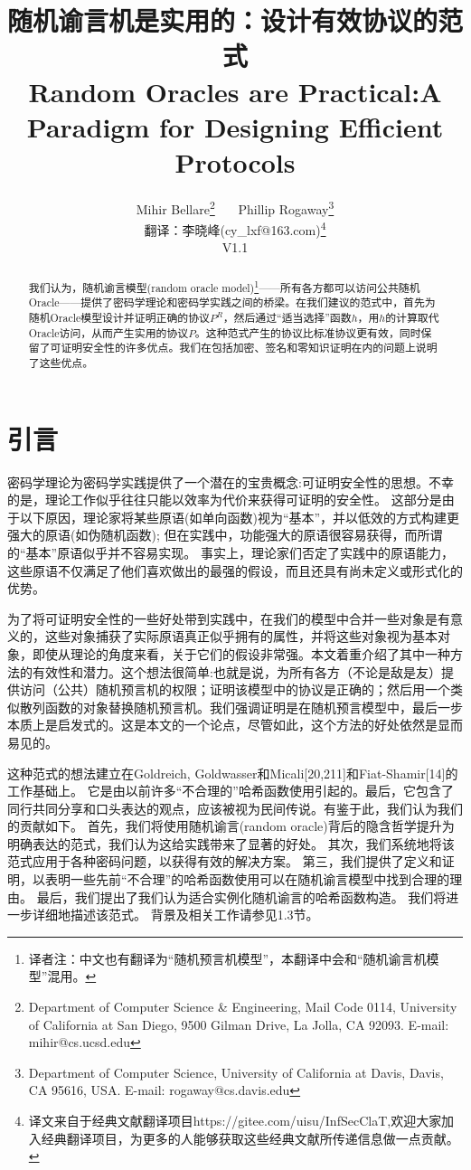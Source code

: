 \documentclass[]{article}
\title{随机谕言机是实用的：设计有效协议的范式\\
Random Oracles are Practical:A Paradigm for Designing Efficient Protocols}
\author{Mihir Bellare\footnote{ Department of Computer Science \& Engineering, Mail Code 0114, University of California at San Diego, 9500
		Gilman Drive, La Jolla, CA 92093. E-mail: mihir@cs.ucsd.edu} \ \ \  Phillip Rogaway\footnote{Department of Computer Science, University of California at Davis, Davis, CA 95616, USA. E-mail:
		rogaway@cs.davis.edu} \\
{\small  翻译：李晓峰(cy\_lxf@163.com)}\footnote{译文来自于经典文献翻译项目https://gitee.com/uisu/InfSecClaT,欢迎大家加入经典翻译项目，为更多的人能够获取这些经典文献所传递信息做一点贡献。}\\
{\small  V1.1}
}
\begin{document}
	
	\maketitle
	
	\begin{abstract}
		我们认为，随机谕言模型(random oracle model)\footnote{译者注：中文也有翻译为“随机预言机模型”，本翻译中会和“随机谕言机模型”混用。}——所有各方都可以访问公共随机Oracle——提供了密码学理论和密码学实践之间的桥梁。在我们建议的范式中，首先为随机Oracle模型设计并证明正确的协议$P^R$，然后通过“适当选择”函数$h$，用$h$的计算取代Oracle访问，从而产生实用的协议$P$。这种范式产生的协议比标准协议更有效，同时保留了可证明安全性的许多优点。我们在包括加密、签名和零知识证明在内的问题上说明了这些优点。
	\end{abstract}


    \section{引言}
	
	密码学理论为密码学实践提供了一个潜在的宝贵概念:可证明安全性的思想。不幸的是，理论工作似乎往往只能以效率为代价来获得可证明的安全性。
	这部分是由于以下原因，理论家将某些原语(如单向函数)视为“基本”，并以低效的方式构建更强大的原语(如伪随机函数);
	但在实践中，功能强大的原语很容易获得，而所谓的“基本”原语似乎并不容易实现。
	事实上，理论家们否定了实践中的原语能力，这些原语不仅满足了他们喜欢做出的最强的假设，而且还具有尚未定义或形式化的优势。
	
	
	为了将可证明安全性的一些好处带到实践中，在我们的模型中合并一些对象是有意义的，这些对象捕获了实际原语真正似乎拥有的属性，并将这些对象视为基本对象，即使从理论的角度来看，关于它们的假设非常强。本文着重介绍了其中一种方法的有效性和潜力。这个想法很简单:也就是说，为所有各方（不论是敌是友）提供访问（公共）随机预言机的权限；证明该模型中的协议是正确的；然后用一个类似散列函数的对象替换随机预言机。我们强调证明是在随机预言模型中，最后一步本质上是启发式的。这是本文的一个论点，尽管如此，这个方法的好处依然是显而易见的。
	
	这种范式的想法建立在Goldreich, Goldwasser和Micali[20,211]和Fiat-Shamir[14]的工作基础上。
	它是由以前许多“不合理的”哈希函数使用引起的。最后，它包含了同行共同分享和口头表达的观点，应该被视为民间传说。有鉴于此，我们认为我们的贡献如下。
	首先，我们将使用随机谕言(random oracle)背后的隐含哲学提升为明确表达的范式，我们认为这给实践带来了显著的好处。
	其次，我们系统地将该范式应用于各种密码问题，以获得有效的解决方案。
	第三，我们提供了定义和证明，以表明一些先前“不合理”的哈希函数使用可以在随机谕言模型中找到合理的理由。
	最后，我们提出了我们认为适合实例化随机谕言的哈希函数构造。
	我们将进一步详细地描述该范式。
	背景及相关工作请参见1.3节。
	
\end{document}
